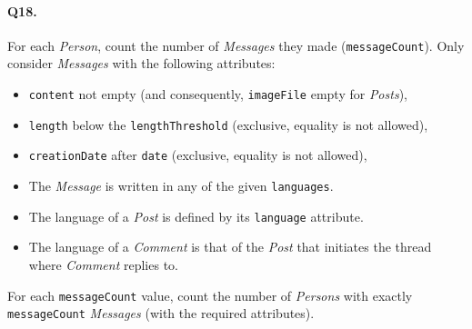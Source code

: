 \paragraph{Q18.}
For each \emph{Person}, count the number of \emph{Messages} they made
(\texttt{messageCount}). Only consider \emph{Messages} with the
following attributes:
\begin{itemize}
\item
  \texttt{content} not empty (and consequently, \texttt{imageFile} empty
  for \emph{Posts}),
\item
  \texttt{length} below the \texttt{lengthThreshold} (exclusive,
  equality is not allowed),
\item
  \texttt{creationDate} after \texttt{date} (exclusive, equality is not
  allowed),
\item
  The \emph{Message} is written in any of the given \texttt{languages}.
\item
  The language of a \emph{Post} is defined by its \texttt{language}
  attribute.
\item
  The language of a \emph{Comment} is that of the \emph{Post} that
  initiates the thread where \emph{Comment} replies to.
\end{itemize}
For each \texttt{messageCount} value, count the number of \emph{Persons}
with exactly \texttt{messageCount} \emph{Messages} (with the required
attributes).
